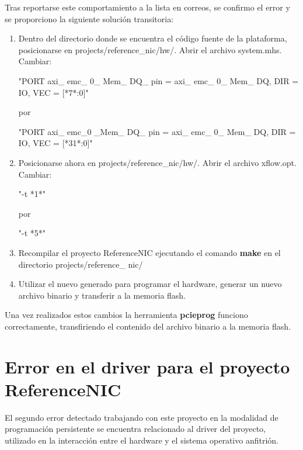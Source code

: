 Tras reportarse este comportamiento a la lista en correos\citep{NetFPGABetaMailing}, se confirmo el error y se proporciono la siguiente solución transitoria:

\begin{enumerate}
\item Dentro del directorio donde se encuentra el c\'odigo fuente de la plataforma, posicionarse en 
	  projects/reference\_nic/hw/. Abrir el archivo system.mhs.\\
	  Cambiar:
\begin{center}
	"PORT axi\_ emc\_ 0\_ Mem\_ DQ\_ pin = axi\_ emc\_ 0\_ Mem\_ DQ, DIR = IO, VEC = [*7*:0]"
\end{center}
por
\begin{center}
"PORT axi\_ emc\_0 \_Mem\_ DQ\_ pin = axi\_ emc\_ 0\_ Mem\_ DQ, DIR = IO, VEC = [*31*:0]"
\end{center}

\item Posicionarse ahora en projects/reference\_nic/hw/. Abrir el archivo xflow.opt.\\
	  Cambiar:
\begin{center}
"-t *1*"
\end{center}
por
\begin{center}
"-t *5*"
\end{center}

\item Recompilar el proyecto ReferenceNIC ejecutando el comando \textbf{make} en el directorio projects/reference\_ nic/

\item Utilizar el nuevo  generado para programar el hardware, generar un nuevo archivo binario y transferir a la memoria flash.
\end{enumerate}

Una vez realizados estos cambios la herramienta \textbf{pcieprog} funciono correctamente, transfiriendo el contenido del archivo binario a la memoria flash.
 
\section{Error en el driver para el proyecto ReferenceNIC}
El segundo error detectado trabajando con este proyecto en la modalidad de programaci\'on persistente  se encuentra relacionado al driver del proyecto, utilizado en la interacción entre el hardware y el sistema operativo anfitrión.\\

